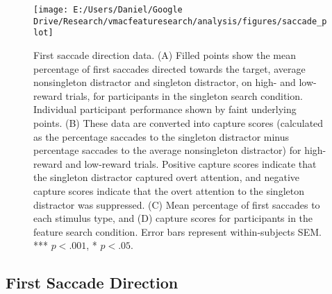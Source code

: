 \documentclass[man, a4paper, noextraspace, 11pt,floatsintext]{apa6}
\begin{document}
\begin{figure}[!h]

{\centering \texttt{[image: E:/Users/Daniel/Google Drive/Research/vmacfeaturesearch/analysis/figures/saccade\_plot]} 

}

\caption{First saccade direction data. (A) Filled points show
the mean percentage of first saccades directed towards the target,
average nonsingleton distractor and singleton distractor, on high- and
low-reward trials, for participants in the singleton search condition.
Individual participant performance shown by faint underlying points. (B)
These data are converted into capture scores (calculated as the
percentage saccades to the singleton distractor minus percentage
saccades to the average nonsingleton distractor) for high-reward and
low-reward trials. Positive capture scores indicate that the singleton
distractor captured overt attention, and negative capture scores
indicate that the overt attention to the singleton distractor was
suppressed. (C) Mean percentage of first saccades to each stimulus type,
and (D) capture scores for participants in the feature search condition.
Error bars represent within-subjects SEM. *** \(p<.001\), * \(p<.05\).}\label{fig:SaccadePlot}
\end{figure}

\subsection{First Saccade Direction}\label{first-saccade-direction}
\end{document}
